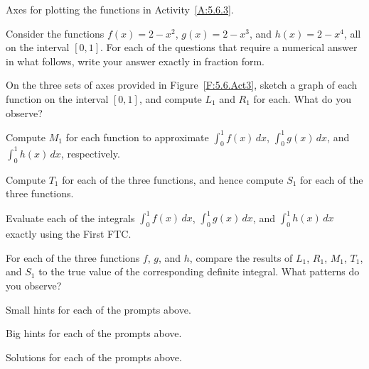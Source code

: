 \begin{marginfigure}[6cm]
\caption{Axes for plotting the functions in Activity~\ref{A:5.6.3}.} 
\label{F:5.6.Act3}
\end{marginfigure}

\begin{activity} \label{A:5.6.3}  Consider the functions $f(x) = 2-x^2$, $g(x) = 2-x^3$, and $h(x) = 2-x^4$, all on the interval $[0,1]$.  For each of the questions that require a numerical answer in what follows, write your answer exactly in fraction form.
\ba
	\item On the three sets of axes provided in Figure~\ref{F:5.6.Act3}, sketch a graph of each function on the interval $[0,1]$, and compute $L_1$ and $R_1$ for each.  What do you observe?
	\item Compute $M_1$ for each function to approximate $\int_0^1 f(x) \,dx$, $\int_0^1 g(x) \,dx$, and $\int_0^1 h(x) \,dx$, respectively.
	\item Compute $T_1$ for each of the three functions, and hence compute $S_1$ for each of the three functions.
	\item Evaluate each of the integrals $\int_0^1 f(x) \,dx$, $\int_0^1 g(x) \,dx$, and $\int_0^1 h(x) \,dx$ exactly using the First FTC.
	\item For each of the three functions $f$, $g$, and $h$, compare the results of $L_1$, $R_1$, $M_1$, $T_1$, and $S_1$ to the true value of the corresponding definite integral.  What patterns do you observe?
\ea

\end{activity}
\begin{smallhint}
\ba
	\item Small hints for each of the prompts above.
\ea
\end{smallhint}
\begin{bighint}
\ba
	\item Big hints for each of the prompts above.
\ea
\end{bighint}
\begin{activitySolution}
\ba
	\item Solutions for each of the prompts above.
\ea
\end{activitySolution}
\aftera